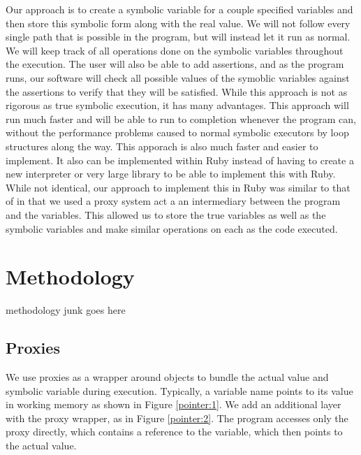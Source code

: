 \documentclass[10pt]{article}
\begin{document}
Our approach is to create a symbolic variable for a couple specified variables and then store this symbolic form along with the real value.  We will not follow every single path that is possible in the program, but will instead let it run as normal.  We will keep track of all operations done on the symbolic variables throughout the execution.  The user will also be able to add assertions, and as the program runs, our software will check all possible values of the symoblic variables against the assertions to verify that they will be satisfied.  While this approach is not as rigorous as true symbolic execution, it has many advantages.  This approach will run much faster and will be able to run to completion whenever the program can, without the performance problems caused to normal symbolic executors by loop structures along the way.  This apporach is also much faster and easier to implement.  It also can be implemented within Ruby instead of having to create a new interpreter or very large library to be able to implement this with Ruby.\\

While not identical, our approach to implement this in Ruby was similar to that of \cite{typeinf} in that we used a proxy system act a an intermediary between the program and the variables.  This allowed us to store the true variables as well as the symbolic variables and make similar operations on each as the code executed.\\

\section{Methodology}
methodology junk goes here

\subsection{Proxies}
We use proxies as a wrapper around objects to bundle the actual value and symbolic variable during execution.  Typically, a variable name points to its value in working memory as shown in Figure \ref{pointer:1}.  We add an additional layer with the proxy wrapper, as in Figure \ref{pointer:2}.  The program accesses only the proxy directly, which contains a reference to the variable, which then points to the actual value.
\end{document}
